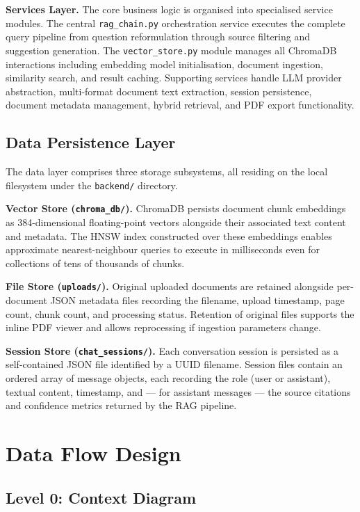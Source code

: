 \textbf{Services Layer.} The core business logic is organised into specialised service modules. The central \texttt{rag\_chain.py} orchestration service executes the complete query pipeline from question reformulation through source filtering and suggestion generation. The \texttt{vector\_store.py} module manages all ChromaDB interactions including embedding model initialisation, document ingestion, similarity search, and result caching. Supporting services handle LLM provider abstraction, multi-format document text extraction, session persistence, document metadata management, hybrid retrieval, and PDF export functionality.

\subsection{Data Persistence Layer}

The data layer comprises three storage subsystems, all residing on the local filesystem under the \texttt{backend/} directory.

\textbf{Vector Store (\texttt{chroma\_db/}).} ChromaDB persists document chunk embeddings as 384-dimensional floating-point vectors alongside their associated text content and metadata. The HNSW index constructed over these embeddings enables approximate nearest-neighbour queries to execute in milliseconds even for collections of tens of thousands of chunks.

\textbf{File Store (\texttt{uploads/}).} Original uploaded documents are retained alongside per-document JSON metadata files recording the filename, upload timestamp, page count, chunk count, and processing status. Retention of original files supports the inline PDF viewer and allows reprocessing if ingestion parameters change.

\textbf{Session Store (\texttt{chat\_sessions/}).} Each conversation session is persisted as a self-contained JSON file identified by a UUID filename. Session files contain an ordered array of message objects, each recording the role (user or assistant), textual content, timestamp, and --- for assistant messages --- the source citations and confidence metrics returned by the RAG pipeline.

\section{Data Flow Design}

\subsection{Level 0: Context Diagram}


